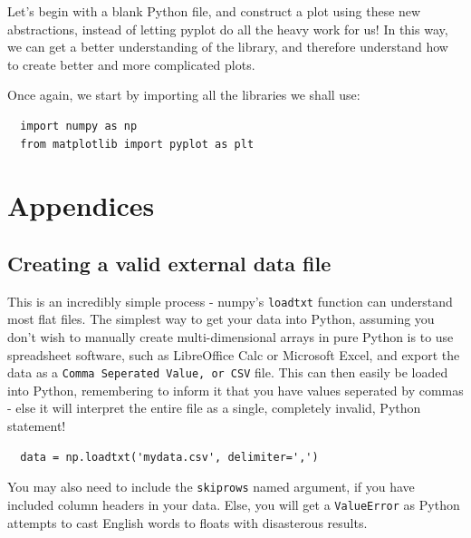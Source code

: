 \documentclass{article}
\begin{document}
Let's begin with a blank Python file, and construct a plot using these
new abstractions, instead of letting pyplot do all the heavy work for
us! In this way, we can get a better understanding of the library, and
therefore understand how to create better and more complicated plots.

Once again, we start by importing all the libraries we shall use:

\begin{lstlisting}
  import numpy as np
  from matplotlib import pyplot as plt
\end{lstlisting}

\section{Appendices}
\subsection{Creating a valid external data file}
This is an incredibly simple process - numpy's \texttt{loadtxt}
function can understand most flat files. The simplest way to get your
data into Python, assuming you don't wish to manually create
multi-dimensional arrays in pure Python is to use spreadsheet
software, such as LibreOffice Calc or Microsoft Excel, and export the
data as a \texttt{Comma Seperated Value, or CSV} file. This can then
easily be loaded into Python, remembering to inform it that you have
values seperated by commas - else it will interpret the entire file as
a single, completely invalid, Python statement!

\begin{lstlisting}
  data = np.loadtxt('mydata.csv', delimiter=',') 
\end{lstlisting}

You may also need to include the \texttt{skiprows} named argument, if
you have included column headers in your data. Else, you will get a
\texttt{ValueError} as Python attempts to cast English words to floats
with disasterous results.
\end{document}
